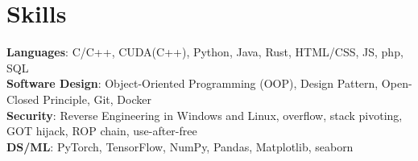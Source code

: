 \documentclass[letterpaper,11pt]{article}
\begin{document}
\section{Skills}
\begin{itemize}[leftmargin=0.15in, label={}]
    \small{
    \item{
        \textbf{Languages}{: C/C++, CUDA(C++), Python, Java, Rust,
        HTML/CSS, JS, php, SQL} \\
        \textbf{Software Design}{: Object-Oriented Programming (OOP),
        Design Pattern, Open-Closed Principle, Git, Docker} \\
        \textbf{Security}{: Reverse Engineering in Windows and Linux,
        overflow, stack pivoting, GOT hijack, ROP chain, use-after-free} \\
        \textbf{DS/ML}{: PyTorch, TensorFlow, NumPy, Pandas,
        Matplotlib, seaborn}
    }}
\end{itemize}

\end{document}

